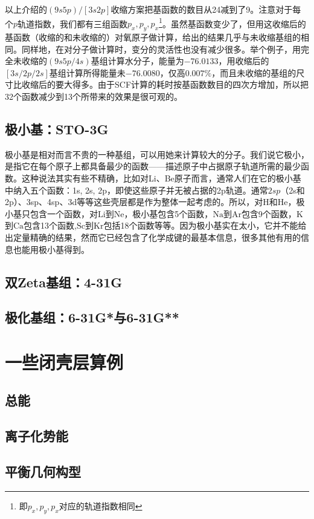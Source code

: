 以上介绍的$(9s5p)/[3s2p]$收缩方案把基函数的数目从24减到了9。注意对于每个$p$轨道指数，我们都有三组函数$p_x,p_y,p_x$\footnote{即$p_x,p_y,p_x$对应的轨道指数相同}。虽然基函数变少了，但用这收缩后的基函数（收缩的和未收缩的）对氧原子做计算，给出的结果几乎与未收缩基组的相同。同样地，在对分子做计算时，变分的灵活性也没有减少很多。举个例子，用完全未收缩的$(9s5p/4s)$基组计算水分子，能量为$-76.0133$，用收缩后的$[3s/2p/2s]$基组计算所得能量未$-76.0080$，仅高$0.007\%$，而且未收缩的基组的尺寸比收缩后的要大得多。由于SCF计算的耗时按基函数数目的四次方增加，所以把32个函数减少到13个所带来的效果是很可观的。

\subsection{极小基：STO-3G}
极小基是相对而言不贵的一种基组，可以用她来计算较大的分子。我们说它极小，是指它在每个原子上都具备最少的函数——描述原子中占据原子轨道所需的最少函数。这种说法其实有些不精确，比如对Li、Be原子而言，通常人们在它的极小基中纳入五个函数：1s, 2s, 2p，即使这些原子并无被占据的2p轨道。通常$2sp$（2s和2p）、3sp、4sp、3d等等这些壳层都是作为整体一起考虑的。所以，对$\mathrm{H}$和$\mathrm{He}$，极小基只包含一个函数，对$\mathrm{Li}$到$\mathrm{Ne}$，极小基包含5个函数，$\mathrm{Na}$到$\mathrm{Ar}$包含9个函数，$\mathrm{K}$到$\mathrm{Ca}$包含13个函数,$\mathrm{Sc}$到$\mathrm{Kr}$包括18个函数等等。因为极小基实在太小，它并不能给出定量精确的结果，然而它已经包含了化学成键的最基本信息，很多其他有用的信息也能用极小基得到。



\subsection{双Zeta基组：4-31G}
\subsection{极化基组：6-31G*与6-31G**}
\section{一些闭壳层算例}
\subsection{总能}
\subsection{离子化势能}
\subsection{平衡几何构型}
